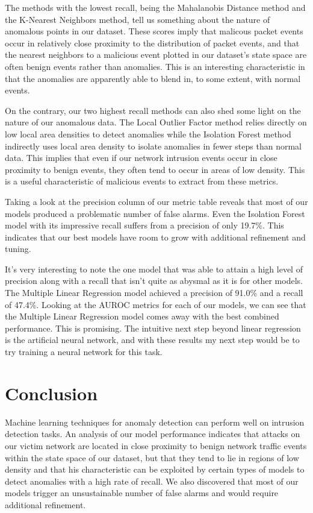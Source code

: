 \documentclass[conference]{IEEEtran}
\begin{document}
The methods with the lowest recall, being the Mahalanobis Distance method and the K-Nearest Neighbors method, tell us something about the nature of anomalous points in our dataset. These scores imply that malicous packet events occur in relatively close proximity to the distribution of packet events, and that the nearest neighbors to a malicious event plotted in our dataset's state space are often benign events rather than anomalies. This is an interesting characteristic in that the anomalies are apparently able to blend in, to some extent, with normal events.

On the contrary, our two highest recall methods can also shed some light on the nature of our anomalous data. The Local Outlier Factor method relies directly on low local area densities to detect anomalies while the Isolation Forest method indirectly uses local area density to isolate anomalies in fewer steps than normal data. This implies that even if our network intrusion events occur in close proximity to benign events, they often tend to occur in areas of low density. This is a useful characteristic of malicious events to extract from these metrics.

Taking a look at the precision column of our metric table reveals that most of our models produced a problematic number of false alarms. Even the Isolation Forest model with its impressive recall suffers from a precision of only 19.7\%. This indicates that our best models have room to grow with additional refinement and tuning.

It's very interesting to note the one model that was able to attain a high level of precision along with a recall that isn't quite as abysmal as it is for other models. The Multiple Linear Regression model achieved a precision of 91.0\% and a recall of 47.4\%. Looking at the AUROC metrics for each of our models, we can see that the Multiple Linear Regression model comes away with the best combined performance. This is promising. The intuitive next step beyond linear regression is the artificial neural network, and with these results my next step would be to try training a neural network for this task.

\section{Conclusion}

Machine learning techniques for anomaly detection can perform well on intrusion detection tasks. An analysis of our model performance indicates that attacks on our victim network are located in close proximity to benign network traffic events within the state space of our dataset, but that they tend to lie in regions of low density and that his characteristic can be exploited by certain types of models to detect anomalies with a high rate of recall. We also discovered that most of our models trigger an unsustainable number of false alarms and would require additional refinement.
\end{document}
